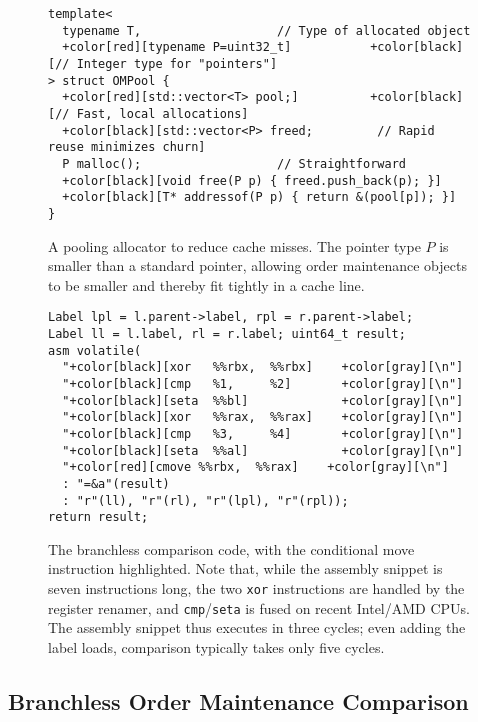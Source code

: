 \begin{figure}
\begin{Verbatim}[formatcom=\color{gray}, commandchars={+[]}]
template<
  typename T,                   // Type of allocated object
  +color[red][typename P=uint32_t]           +color[black][// Integer type for "pointers"]
> struct OMPool {
  +color[red][std::vector<T> pool;]          +color[black][// Fast, local allocations]
  +color[black][std::vector<P> freed;         // Rapid reuse minimizes churn]
  P malloc();                   // Straightforward
  +color[black][void free(P p) { freed.push_back(p); }]
  +color[black][T* addressof(P p) { return &(pool[p]); }]
}
\end{Verbatim}
\caption{A pooling allocator to reduce cache misses.
  The pointer type $P$ is smaller than a standard pointer,
    allowing order maintenance objects to be smaller
    and thereby fit tightly in a cache line.}
\label{fig:allocator}
\end{figure}

\begin{figure}
\begin{Verbatim}[formatcom=\color{gray}, commandchars={+[]}]
Label lpl = l.parent->label, rpl = r.parent->label;
Label ll = l.label, rl = r.label; uint64_t result;
asm volatile(
  "+color[black][xor   %%rbx,  %%rbx]    +color[gray][\n"]
  "+color[black][cmp   %1,     %2]       +color[gray][\n"]
  "+color[black][seta  %%bl]             +color[gray][\n"]
  "+color[black][xor   %%rax,  %%rax]    +color[gray][\n"]
  "+color[black][cmp   %3,     %4]       +color[gray][\n"]
  "+color[black][seta  %%al]             +color[gray][\n"]
  "+color[red][cmove %%rbx,  %%rax]    +color[gray][\n"]
  : "=&a"(result)
  : "r"(ll), "r"(rl), "r"(lpl), "r"(rpl));
return result;
\end{Verbatim}
\caption{
  The branchless comparison code,
    with the conditional move instruction highlighted.
  Note that, while the assembly snippet
    is seven instructions long,
    the two \texttt{xor} instructions
    are handled by the register renamer,
    and \texttt{cmp}/\texttt{seta} is fused on recent Intel/AMD CPUs.
  The assembly snippet thus executes in three cycles;
    even adding the label loads,
    comparison typically takes only five cycles.
}
\label{fig:compare}
\end{figure}

\subsection{Branchless Order Maintenance Comparison}

